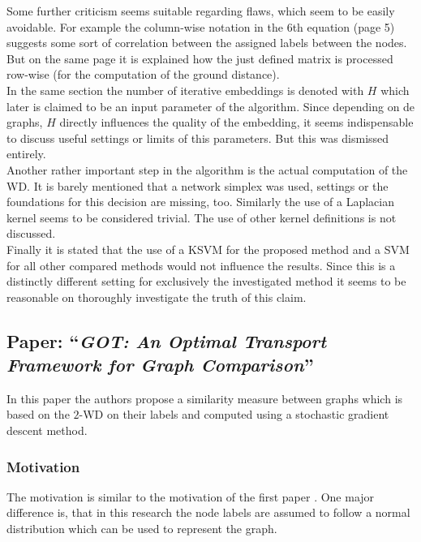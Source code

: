 \documentclass[twoside,twocolumn]{scrartcl}
\begin{document}
Some further criticism seems suitable regarding flaws, which seem to be easily avoidable. For example the column-wise notation in the 6th equation (page 5) suggests some sort of correlation between the assigned labels between the nodes. But on the same page it is explained how the just defined matrix is processed row-wise (for the computation of the ground distance).\\
In the same section the number of iterative embeddings is denoted with $H$ which later is claimed to be an input parameter of the algorithm. Since depending on de graphs, $H$ directly influences the quality of the embedding, it seems indispensable to discuss useful settings or limits of this parameters. But this was dismissed entirely.\\

Another rather important step in the algorithm is the actual computation of the WD. It is barely mentioned that a network simplex was used, settings or the foundations for this decision are missing, too. Similarly the use of a Laplacian kernel seems to be considered trivial. The use of other kernel definitions is not discussed.\\

Finally it is stated that the use of a KSVM for the proposed method and a SVM for all other compared methods would not influence the results. Since this is a distinctly different setting for exclusively the investigated method it seems to be reasonable on thoroughly investigate the truth of this claim.

\subsection{Paper: \enquote{\textit{GOT: An Optimal Transport Framework for Graph Comparison}}}

In this paper the authors propose a similarity measure between graphs which is based on the $2$-WD on their labels and computed using a stochastic gradient descent method.

\subsubsection{Motivation}
The motivation is similar to the motivation of the first paper \cite{A}. One major difference is, that in this research the node labels are assumed to follow a normal distribution which can be used to represent the graph.
\end{document}
